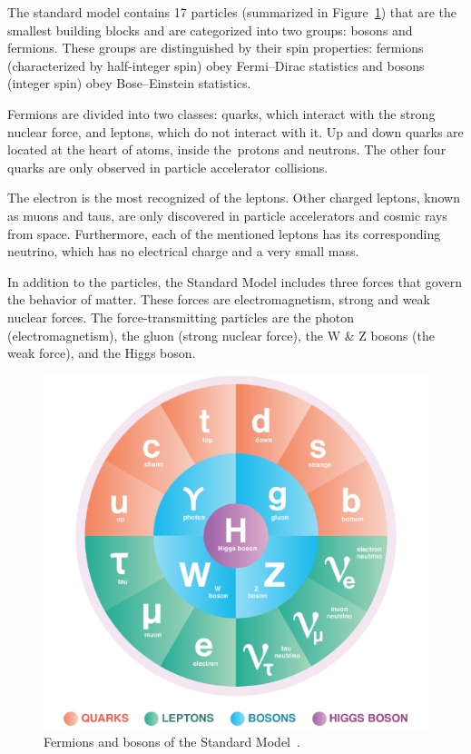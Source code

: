 The standard model contains 17 particles (summarized in Figure~\ref{fig_standard})  that are the smallest building blocks and are categorized into two groups: bosons and fermions. These groups are distinguished by their spin properties: fermions (characterized by half-integer spin) obey Fermi–Dirac statistics and bosons (integer spin) obey Bose–Einstein statistics. 

Fermions are divided into two classes: quarks, which interact with the strong nuclear force, and leptons, which do not interact with it. Up and down quarks are located at the heart of atoms, inside the protons and neutrons. The other four quarks are only observed in particle accelerator collisions.

The electron is the most recognized of the leptons. Other charged leptons, known as muons and taus, are only discovered in particle accelerators and cosmic rays from space. Furthermore, each of the mentioned leptons has its corresponding neutrino, which has no electrical charge and a very small mass.

In addition to the particles, the Standard Model includes three forces that govern the behavior of matter. These forces are electromagnetism, strong and weak nuclear forces. The force-transmitting particles are the photon (electromagnetism), the gluon (strong nuclear force), the W \& Z bosons (the weak force), and the Higgs boson.

\begin{figure}[!h]
\centering
\includegraphics[width=0.7\columnwidth]{Chapter1/images/particles.png}
\caption{Fermions and bosons of the Standard Model~\cite{standard_model}.}
\label{fig_standard}
\end{figure}

